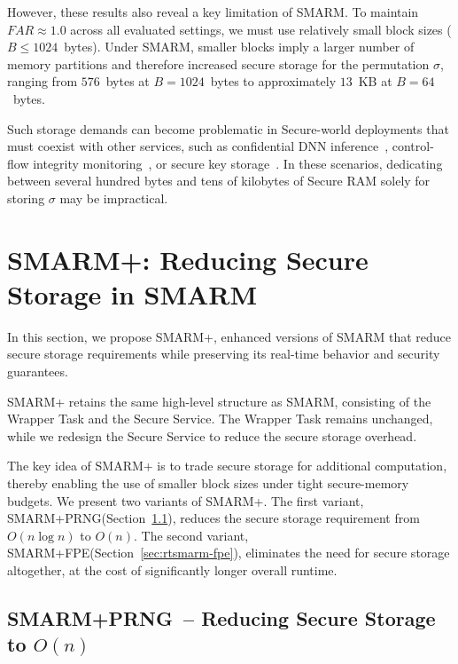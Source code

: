 \documentclass{ieeeaccess}
\newcommand{\rtsmarm}{SMARM+\xspace}
\newcommand{\rtsmarmone}{SMARM+PRNG\xspace}
\newcommand{\rtsmarmtwo}{SMARM+FPE\xspace}
\begin{document}
However, these results also reveal a key limitation of SMARM.
To maintain $FAR \approx 1.0$ across all evaluated settings, we must use relatively small block sizes ($B \leq 1024$~bytes).
Under SMARM, smaller blocks imply a larger number of memory partitions and therefore increased secure storage for the permutation $\sigma$, ranging from $576$~bytes at $B = 1024$~bytes to approximately $13$~KB at $B = 64$~bytes.

Such storage demands can become problematic in Secure-world deployments that must coexist with other services, such as confidential DNN inference~\cite{tslices}, control-flow integrity monitoring~\cite{tzmcfi}, or secure key storage~\cite{silabs-secure-key-storage}.
In these scenarios, dedicating between several hundred bytes and tens of kilobytes of Secure RAM solely for storing $\sigma$ may be impractical.



\section{\rtsmarm: Reducing Secure Storage in SMARM}
\label{sec:resmarm-design}


In this section, we propose \rtsmarm, enhanced versions of SMARM that reduce secure storage requirements while preserving its real-time behavior and security guarantees.

\rtsmarm retains the same high-level structure as SMARM, consisting of the Wrapper Task and the Secure Service.
The Wrapper Task remains unchanged, while we redesign the Secure Service to reduce the secure storage overhead.

The key idea of \rtsmarm is to trade secure storage for additional computation, thereby enabling the use of smaller block sizes under tight secure-memory budgets.
We present two variants of \rtsmarm.
The first variant, \rtsmarmone (Section~\ref{sec:rtsmarm-bitarray}), reduces the secure storage requirement from $O(n \log n)$ to $O(n)$.
The second variant, \rtsmarmtwo (Section~\ref{sec:rtsmarm-fpe}), eliminates the need for secure storage altogether, at the cost of significantly longer overall runtime.




\subsection{\rtsmarmone\ -- Reducing Secure Storage to $O(n)$}
\label{sec:rtsmarm-bitarray}
\end{document}
